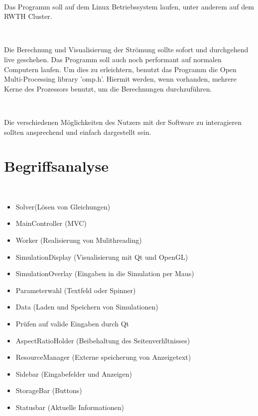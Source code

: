 \documentclass[a4paper,12pt]{scrreprt}
\begin{document}
\begin{description}[font=\normalfont\textit]
	\item[Benutzbarkeitsanforderungen:] ~
	
	Das Programm soll auf dem Linux Betriebssystem laufen, unter anderem auf dem RWTH Cluster.
	
	\item[Performance:] ~
	
	Die Berechnung und Visualisierung der Strömung sollte sofort und durchgehend live geschehen. Das Programm soll auch noch performant auf normalen Computern laufen. Um dies zu erleichtern, benutzt das Programm die Open Multi-Processing library 	'omp.h'. Hiermit werden, wenn vorhanden, mehrere Kerne des Prozessors benutzt, um die Berechnungen durchzuf\"uhren.
	
	\item[Anzeige eines Userinterfaces:] ~
	
	Die verschiedenen Möglichkeiten des Nutzers mit der Software zu interagieren sollten ansprechend und einfach dargestellt sein. 
	
\end{description}


\section{Begriffsanalyse}

\begin{description}[font=\normalfont\textbf]
	\item[Klassenkandidaten:] ~
	\begin{itemize}
		\item Solver(L\"osen von Gleichungen) 
		\item MainController (MVC)
		\item Worker (Realisierung von Mulithreading)
		\item SimulationDisplay (Visualisierung mit Qt und OpenGL)
		\item SimulationOverlay (Eingaben in die Simulation per Maus)
		\item Parameterwahl (Textfeld oder Spinner) 
		\item Data (Laden und Speichern von Simulationen)
		\item Pr\"ufen auf valide Eingaben durch Qt
		\item AspectRatioHolder (Beibehaltung des Seitenverh\"ltnisses)
		\item ResourceManager (Externe speicherung von Anzeigetext)
		\item Sidebar (Eingabefelder und Anzeigen)
		\item StorageBar (Buttons)		
		\item Statusbar (Aktuelle Informationen)
	\end{itemize}
\end{description}
\end{document}
